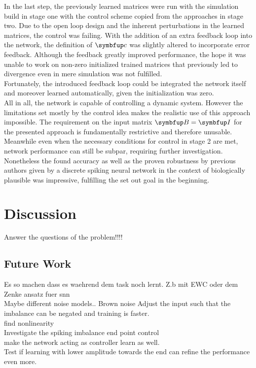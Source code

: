 In the last step, the previously learned matrices were run with the simulation build in stage one with the control scheme copied from the approaches in stage two. Due to the open loop design and the inherent perturbations in the learned matrices, the control was failing. With the addition of an extra feedback loop into the network, the definition of $\bmu{c}$ was slightly altered to incorporate error feedback.
Although the feedback greatly improved performance, the hope it was unable to work on non-zero initialized trained matrices that previously led to divergence even in mere simulation was not fulfilled.\\
Fortunately, the introduced feedback loop could be integrated the network itself and moreover learned automatically, given the initialization was zero.\\

All in all, the network is capable of controlling a dynamic system. However the limitations set mostly by the control idea makes the realistic use of this approach impossible. The requirement on the input matrix $\bmu{B} = \bmu{I}$ for the presented approach is fundamentally restrictive and therefore unusable. Meanwhile even when the necessary conditions for control in stage 2 are met, network performance can still be subpar, requiring further investigation.\\

Nonetheless the found accuracy as well as the proven robustness by previous authors given by a discrete spiking neural network in the context of biologically plausible was impressive, fulfilling the set out goal in the beginning.\\


\section{Discussion}

Answer the questions of the problem!!!!\\

\subsection{Future Work}
Es so machen dass es waehrend dem task noch lernt. Z.b mit EWC oder dem Zenke ansatz fuer snn\\
Maybe different noise models.. Brown noise
Adjust the input such that the imbalance can be negated and training is faster.\\
find nonlinearity\\
Investigate the spiking imbalance
end point control\\
make the network acting as controller learn as well.\\
Test if learning with lower amplitude towards the end can refine the performance even more.\\

